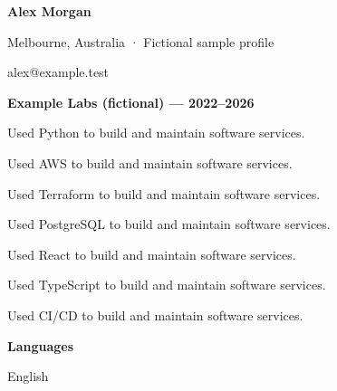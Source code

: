 \documentclass[10pt,a4paper]{article}
\begin{document}
{\LARGE\bfseries\color{navy} Alex Morgan}\par
Melbourne, Australia · Fictional sample profile\par
alex@example.test\par
{\large\bfseries\color{navy} Example Labs (fictional) — 2022–2026}\par
Used Python to build and maintain software services.\par
Used AWS to build and maintain software services.\par
Used Terraform to build and maintain software services.\par
Used PostgreSQL to build and maintain software services.\par
Used React to build and maintain software services.\par
Used TypeScript to build and maintain software services.\par
Used CI/CD to build and maintain software services.\par
{\large\bfseries\color{navy} Languages}\par
English\par
\end{document}
